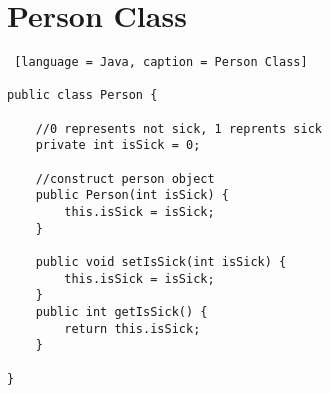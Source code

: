 \documentclass{article}
\begin{document}
\section{Person Class}

\begin{lstlisting} [language = Java, caption = Person Class]

public class Person {

    //0 represents not sick, 1 reprents sick
    private int isSick = 0;

    //construct person object
    public Person(int isSick) {
        this.isSick = isSick;
    }
    
    public void setIsSick(int isSick) {
        this.isSick = isSick;
    }
    public int getIsSick() {
        return this.isSick;
    }
    
}

\end{lstlisting}
\end{document}
